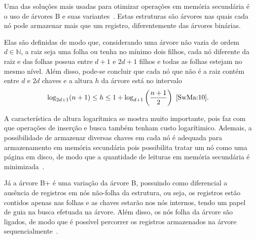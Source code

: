 \documentclass[12pt]{article}
\begin{document}
Uma das soluções mais usadas para otimizar operações em memória secundária é o
uso de árvores B e suas variantes~\cite{Co:79}. Estas estruturas são árvores nas
quais cada nó pode armazenar mais que um registro, diferentemente das árvores
binárias.

Elas são definidas de modo que, considerando uma árvore não vazia de ordem $d
\in \mathbb{N}$, a raiz seja uma folha ou tenha no mínimo dois filhos, cada nó
diferente da raiz e das folhas possua entre $d+1$ e $2d +1$ filhos e todas as
folhas estejam no mesmo nível. Além disso, pode-se concluir que cada nó que não
é a raiz contém entre $d$ e $2d$ chaves e a altura $h$ da árvore está no
intervalo
\[ \log_{2d+1} (n+1) \leq h \leq 1 + \log_{d+1} \left(\frac{n +
1}{2}\right)~\cite{SwMa:10}. \]

A característica de altura logarítmica se mostra muito importante, pois faz com
que operações de inserção e busca também tenham custo logarítimico. Ademais, a
possibilidade de armazenar diversas chaves em cada nó é adequada para
armazenamento em memória secundária pois possibilita tratar um nó como uma
página %
em disco, de modo que a quantidade de leituras em memória secundária é
minimizada~\cite{Kn:98}.



Já a árvore B+ é uma variação da árvore B, possuindo como diferencial a ausência
de registros em nós não-folha da estrutura, ou seja, os registros estão contidos
apenas nas folhas e as chaves estarão nos nós internos, tendo um papel de guia
na busca efetuada na árvore. Além disso, os nós folha da árvore são ligados, de
modo que é possível percorrer os registros armazenados na árvore
sequencialmente~\cite{Pm:10}.
\end{document}
